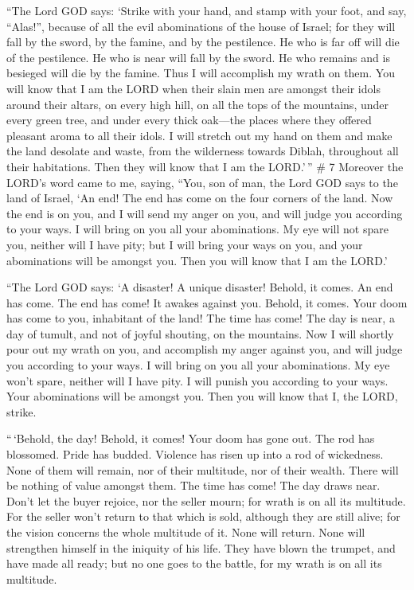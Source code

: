  ``The Lord GOD says: `Strike with your hand, and stamp
with your foot, and say, ``Alas!'', because of all the evil abominations
of the house of Israel; for they will fall by the sword, by the famine,
and by the pestilence.  He who is far off will die of the
pestilence. He who is near will fall by the sword. He who remains and is
besieged will die by the famine. Thus I will accomplish my wrath on
them.  You will know that I am the LORD when their slain
men are amongst their idols around their altars, on every high hill, on
all the tops of the mountains, under every green tree, and under every
thick oak---the places where they offered pleasant aroma to all their
idols.  I will stretch out my hand on them and make the
land desolate and waste, from the wilderness towards Diblah, throughout
all their habitations. Then they will know that I am the LORD.'\,'' \# 7
 Moreover the LORD's word came to me, saying, 
``You, son of man, the Lord GOD says to the land of Israel, `An end! The
end has come on the four corners of the land.  Now the end
is on you, and I will send my anger on you, and will judge you according
to your ways. I will bring on you all your abominations.  My
eye will not spare you, neither will I have pity; but I will bring your
ways on you, and your abominations will be amongst you. Then you will
know that I am the LORD.'

 ``The Lord GOD says: `A disaster! A unique disaster!
Behold, it comes.  An end has come. The end has come! It
awakes against you. Behold, it comes.  Your doom has come to
you, inhabitant of the land! The time has come! The day is near, a day
of tumult, and not of joyful shouting, on the mountains. 
Now I will shortly pour out my wrath on you, and accomplish my anger
against you, and will judge you according to your ways. I will bring on
you all your abominations.  My eye won't spare, neither will
I have pity. I will punish you according to your ways. Your abominations
will be amongst you. Then you will know that I, the LORD, strike.

 ``\,`Behold, the day! Behold, it comes! Your doom has gone
out. The rod has blossomed. Pride has budded.  Violence has
risen up into a rod of wickedness. None of them will remain, nor of
their multitude, nor of their wealth. There will be nothing of value
amongst them.  The time has come! The day draws near. Don't
let the buyer rejoice, nor the seller mourn; for wrath is on all its
multitude.  For the seller won't return to that which is
sold, although they are still alive; for the vision concerns the whole
multitude of it. None will return. None will strengthen himself in the
iniquity of his life.  They have blown the trumpet, and
have made all ready; but no one goes to the battle, for my wrath is on
all its multitude.

